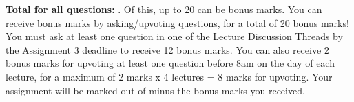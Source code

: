 \documentclass{article}
\DeclareMathOperator*{\1}{\mathbbm{1}}
\newcommand{\0}{\mathbf{0}}
\newcounter{DocPoints} %
\theoremstyle{definition}
\newtheorem{question}{Question}
\theoremstyle{remark}
\newtheorem*{solution*}{Solution}
\theoremstyle{theorem}
\begin{document}


\bigskip
\bigskip

\noindent
\textbf{
Total for all questions: }.
Of this, up to 20 can be bonus marks. You can receive bonus marks by asking/upvoting questions, for a total of 20 bonus marks!
You must ask at least one question in one of the Lecture Discussion Threads by the Assignment 3 deadline to receive 12 bonus marks.
You can also receive 2 bonus marks for upvoting at least one question before 8am on the day of each lecture, for a maximum of 2 marks x 4 lectures = 8 marks for upvoting.
Your assignment will be marked out of  minus the bonus marks you received.
\end{document}
